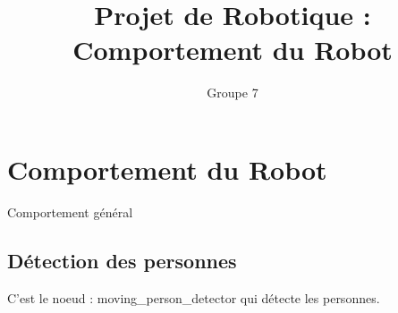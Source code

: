 \documentclass{article}
\title{Projet de Robotique : Comportement du Robot}
\author{Groupe 7}
\begin{document}
\maketitle

\section{Comportement du Robot}
\begin{algorithm}[H]
  \caption{Comportement g\'en\'eral}
\end{algorithm}

\subsection{D\'etection des personnes}

C'est le noeud : moving\_person\_detector qui d\'etecte les personnes.
\end{document}
